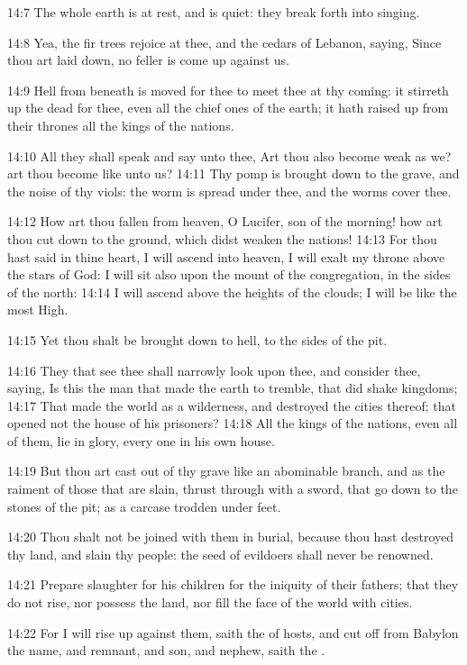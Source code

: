 14:7 The whole earth is at rest, and is quiet: they break forth into
singing.

14:8 Yea, the fir trees rejoice at thee, and the cedars of Lebanon,
saying, Since thou art laid down, no feller is come up against us.

14:9 Hell from beneath is moved for thee to meet thee at thy coming:
it stirreth up the dead for thee, even all the chief ones of the
earth; it hath raised up from their thrones all the kings of the
nations.

14:10 All they shall speak and say unto thee, Art thou also become
weak as we? art thou become like unto us?  14:11 Thy pomp is brought
down to the grave, and the noise of thy viols: the worm is spread
under thee, and the worms cover thee.

14:12 How art thou fallen from heaven, O Lucifer, son of the morning!
how art thou cut down to the ground, which didst weaken the nations!
14:13 For thou hast said in thine heart, I will ascend into heaven, I
will exalt my throne above the stars of God: I will sit also upon the
mount of the congregation, in the sides of the north: 14:14 I will
ascend above the heights of the clouds; I will be like the most High.

14:15 Yet thou shalt be brought down to hell, to the sides of the pit.

14:16 They that see thee shall narrowly look upon thee, and consider
thee, saying, Is this the man that made the earth to tremble, that did
shake kingdoms; 14:17 That made the world as a wilderness, and
destroyed the cities thereof; that opened not the house of his
prisoners?  14:18 All the kings of the nations, even all of them, lie
in glory, every one in his own house.

14:19 But thou art cast out of thy grave like an abominable branch,
and as the raiment of those that are slain, thrust through with a
sword, that go down to the stones of the pit; as a carcase trodden
under feet.

14:20 Thou shalt not be joined with them in burial, because thou hast
destroyed thy land, and slain thy people: the seed of evildoers shall
never be renowned.

14:21 Prepare slaughter for his children for the iniquity of their
fathers; that they do not rise, nor possess the land, nor fill the
face of the world with cities.

14:22 For I will rise up against them, saith the \LORD of hosts, and
cut off from Babylon the name, and remnant, and son, and nephew, saith
the \LORD.


